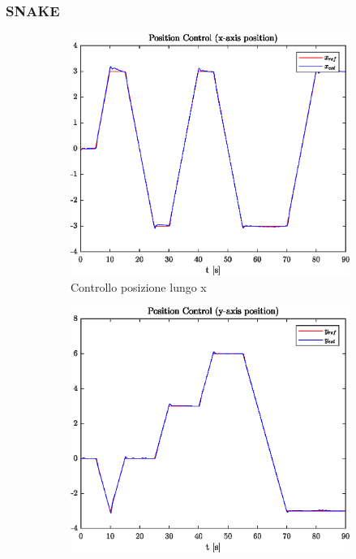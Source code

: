 \clearpage
\subsubsection{SNAKE}
\begin{figure}
	\centering
	\begin{subfigure}{0.45\textwidth}
		\centering
		\includegraphics[width=1\textwidth]{Simulazioni/Figure/SMC/SNAKE/PositionControlXPos}
		\caption{Controllo posizione lungo x}
	\end{subfigure}
	\hfill
	\begin{subfigure}{0.45\textwidth}
		\centering
		\includegraphics[width=1\textwidth]{Simulazioni/Figure/SMC/SNAKE/PositionControlYPos}

\end{subfigure}
\end{figure}
